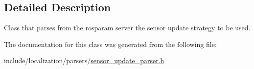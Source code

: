 \subsection{Detailed Description}
Class that parses from the rosparam server the sensor update strategy to be used. 

The documentation for this class was generated from the following file\-:\begin{DoxyCompactItemize}
\item 
include/localization/parsers/\hyperlink{sensor__update__parser_8h}{sensor\-\_\-update\-\_\-parser.\-h}\end{DoxyCompactItemize}
